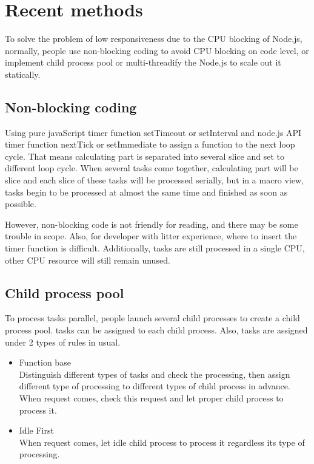 \documentclass[JIP]{ipsj}
\begin{document}
\section{Recent methods}
To solve the problem of low responsiveness due to the CPU blocking of Node.js, normally, people use non-blocking coding to avoid CPU blocking on code level, or implement child process pool or multi-threadify the Node.js to scale out it statically.
\subsection{Non-blocking coding}
Using pure javaScript timer function setTimeout or setInterval and node.js API timer function nextTick or setImmediate to assign a function to the next loop cycle. That means calculating part is separated into several slice and set to different loop cycle. When several tasks come together, calculating part will be slice and each slice of these tasks will be processed serially, but in a macro view, tasks begin to be processed at almost the same time and finished as soon as possible.

However, non-blocking code is not friendly for reading, and there may be some trouble in scope. Also, for developer with litter experience, where to insert the timer function is difficult. Additionally, tasks are still processed in a single CPU, other CPU resource will still remain unused. 

\subsection{Child process pool}
To process tasks parallel, people launch several child processes to create a child process pool.
tasks can be assigned to each child process.
Also, tasks are assigned under 2 types of rules in usual.

\begin{itemize}
\item Function base \\
Distinguish different types of tasks and check the processing, then assign different type of processing to different types of child process in advance.
When request comes, check this request and let proper child process to process it.

\item Idle First \\
When request comes, let idle child process to process it regardless its type of processing.

\end{itemize}
\end{document}
